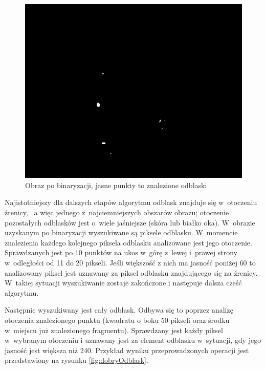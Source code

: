 \begin{figure}[h!]
\begin{center}
\includegraphics[scale=0.3]{binaryzacja.jpg}
\caption{Obraz po binaryzacji, jasne punkty to znalezione odblaski}
\label{fig:binaryzacja}
\end{center}
\end{figure}

Najistotniejszy dla dalszych etapów algorytmu odblask znajduje się w~otoczeniu źrenicy, ~a więc jednego z~najciemniejszych obszarów obrazu; otoczenie pozostałych odblasków jest o~wiele jaśniejsze (skóra lub białko oka). W~obrazie uzyskanym po binaryzacji wyszukiwane są piksele odblasku. W~momencie znalezienia każdego kolejnego piksela odblasku analizowane jest jego otoczenie. Sprawdzanych jest po 10 punktów na ukos w~górę z~lewej i~prawej strony w~odległości od 11 do 20 pikseli. Jeśli większość z nich ma jasność poniżej 60 to analizowany piksel jest uznawany za piksel odblasku znajdującego się na źrenicy. W~takiej sytuacji wyszukiwanie zostaje zakończone i następuje dalsza cześć algorytmu.

Następnie wyszukiwany jest cały odblask. Odbywa się to poprzez analizę otoczenia znalezionego punktu (kwadratu o boku 50 pikseli oraz środku w~miejscu już znalezionego fragmentu). Sprawdzany jest każdy piksel w~wybranym otoczeniu i uznawany jest za element odblasku w~sytuacji, gdy jego jasność jest większa niż 240. Przykład wyniku przeprowadzonych operacji jest przedstawiony na rysunku \ref{fig:dobryOdblask}.


